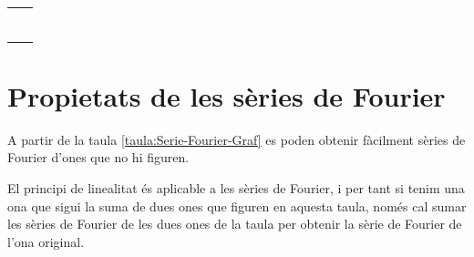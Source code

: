 \begin{longtable}{cc}
    & \raisebox{1.2cm}{$\displaystyle \frac{{2K}}{\piup }\sum\limits_{n = 1}^\infty  {\frac{{( - 1)^{n+1} \sin (n\omega t)}}{n}}$}\\[2.4ex]
    & \raisebox{0.8cm}{$\displaystyle\frac{K}{2} - \frac{{4K}}{{\piup ^2 }}\sum\limits_{n = 1}^\infty  {\frac{{\cos \big((2n - 1)\omega t\big)}}{{(2n - 1)^2 }}}$}\\[2.4ex]
    & \raisebox{1.2cm}{$\displaystyle\frac{{8K}}{{\piup ^2 }}\sum\limits_{n = 1}^\infty  {\frac{{( - 1)^{n-1} \sin \big((2n - 1)\omega t\big)}}{{(2n - 1)^2 }}}$}\\[2.4ex]
    & \raisebox{0.8cm}{$\displaystyle\frac{K}{2} - \frac{{4K}}{{\piup ^2  - 2\piup \omega \tau }}\sum\limits_{n = 1}^\infty  {\frac{{\cos \big((2n-1)\omega \tau \big)\cos \big((2n-1)\omega t\big)}}{{(2n - 1)^2 }}}$}\\[2.4ex]
    & \raisebox{1.2cm}{$\displaystyle\frac{{2K}}{\piup }\sum\limits_{n = 1}^\infty  {\left( {1 + \frac{{\big(1 + ( - 1)^n \big)\sin (n\omega \tau )}}{{n(\piup  - 2\omega \tau )}}} \right)\frac{{( - 1)^{n+1} \sin (n\omega t)}}{n}}$}\\[2.4ex]
    & \raisebox{0.8cm}{$\displaystyle\frac{{2K}}{\piup } - \frac{{4K}}{\piup }\sum\limits_{n = 1}^\infty  {\frac{{\cos(2n\omega t)}}{{4n^2  - 1}}}$}\\[2.4ex]
    & \raisebox{0.8cm}{$\displaystyle\frac{K}{\piup } + \frac{K}{2}\sin (\omega t) - \frac{{2K}}{\piup }\sum\limits_{n = 1}^\infty  {\frac{{\cos (2n\omega t)}}{{4n^2  - 1}}}$}\\[2.4ex]
    \bottomrule[1pt]
\end{longtable}


\section{Propietats de les s\`{e}ries de Fourier}

A partir de la taula \vref{taula:Serie-Fourier-Graf} es poden obtenir f\`{a}cilment s\`{e}ries de Fourier d'ones que no hi figuren.

El principi de linealitat \'{e}s aplicable a les s\`{e}ries de Fourier, i per tant si tenim una ona que sigui la suma de dues ones que figuren en aquesta taula, nom\'{e}s  cal sumar les s\`{e}ries de Fourier de les dues ones de la taula per obtenir la s\`{e}rie de Fourier de l'ona original.

